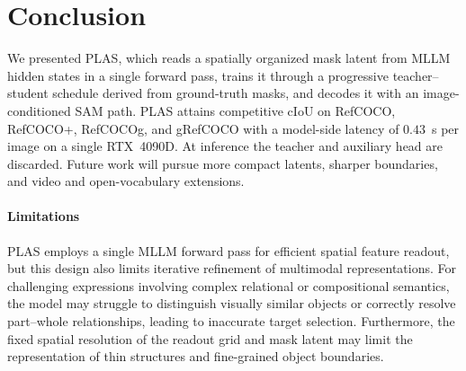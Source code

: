 \begin{table}[!t]
  \centering
  \scriptsize
  \setlength{\tabcolsep}{2.0pt}
  \renewcommand{\arraystretch}{0.96}
  \caption{Ablation on latent-guided initialization.}
  \label{tab:scratch_ablation}
\end{table}




\section{Conclusion}

We presented PLAS, which reads a spatially organized mask latent from MLLM hidden states in a single forward pass, trains it through a progressive teacher--student schedule derived from ground-truth masks, and decodes it with an image-conditioned SAM path. PLAS attains competitive cIoU on RefCOCO, RefCOCO+, RefCOCOg, and gRefCOCO with a model-side latency of $0.43$~s per image on a single RTX~4090D. At inference the teacher and auxiliary head are discarded. Future work will pursue more compact latents, sharper boundaries, and video and open-vocabulary extensions.

\paragraph{Limitations}
\label{sec:limitations}

PLAS employs a single MLLM forward pass for efficient
spatial feature readout, but this design also limits
iterative refinement of multimodal representations.
For challenging expressions involving complex
relational or compositional semantics, the model may
struggle to distinguish visually similar objects
or correctly resolve part--whole relationships,
leading to inaccurate target selection.
Furthermore, the fixed spatial resolution of the
readout grid and mask latent may limit the
representation of thin structures and fine-grained
object boundaries.


